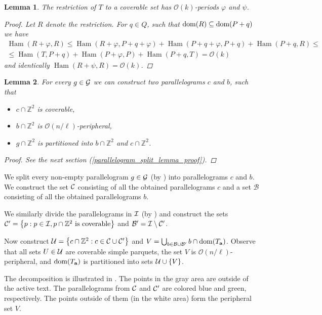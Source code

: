 \documentclass[11pt]{article}
\newcommand{\Z}{\mathbb{Z}}
\renewcommand{\O}{\mathcal{O}}
\renewcommand{\phi}{\varphi}
\newcommand{\set}[1]{\left\lbrace #1 \right\rbrace}
\newcommand{\eq}[1]{\begin{align*} #1 \end{align*}}
\theoremstyle{plain}
\newtheorem{lemma}{Lemma}
\theoremstyle{definition}
\theoremstyle{remark}
\DeclareMathOperator*{\Ham}{Ham}
\begin{document}
\begin{lemma}\label{coverable is periodic}
	The restriction of $T$ to a coverable set has $\O(k)$-periods $\phi$ and $\psi$.
	\begin{proof}
		Let $R$ denote the restriction. For $q \in Q$, such that $\operatorname*{dom}(R) \subseteq \operatorname*{dom}(P + q)$ we have
		\eq{
			\Ham(R + \phi, R) \le \Ham(R + \phi, P + q + \phi) + \Ham(P + q + \phi, P + q) + \Ham(P + q, R) \le \\
			\le \Ham(T, P + q) + \Ham(P + \phi, P) + \Ham(P + q, T) = \O(k)
		}
		and identically $\Ham(R + \psi, R) = \O(k)$.
	\end{proof}
\end{lemma}

\begin{lemma}\label{parallelogram_split_lemma}
	For every $g \in \mathcal{G}$ we can construct two parallelograms $c$ and $b$, such that
	\begin{itemize}
		\item $c \cap \Z^2$ is coverable,
		\item $b \cap \Z^2$ is $\O(n / \ell)$-peripheral,
		\item $g \cap \Z^2$ is partitioned into $b \cap \Z^2$ and $c \cap \Z^2$.
	\end{itemize}
	\begin{proof} See the next section (\ref{parallelogram_split_lemma_proof}). \end{proof}
\end{lemma}

\newcommand{\B}{\mathcal{B}}

We split every non-empty parallelogram $g \in \mathcal{G}$ (by ) into parallelograms $c$ and $b$.
We construct the set $\mathcal{C}$ consisting of all the obtained parallelograms $c$ and a set $\B$ consisting of all the obtained parallelograms $b$.

We similarly divide the parallelograms in $\mathcal{I}$ (by ) and construct the sets $\C' = \set{p : p \in \I, p \cap \Z^2 \text{ is coverable}}$ and $\B' = \I \setminus \C'$.

Now construct $\U = \set{c \cap \Z^2 : c \in \C \cup \C'}$ and $V = \bigcup_{b \in \B \cup \B'} b \cap \d{\Ta}$.
Observe that all sets $U \in \mathcal{U}$ are coverable simple parquets, the set $V$ is $\O(n / \ell)$-peripheral, and $\operatorname*{dom}(T_\mathbf{a})$ is partitioned into sets $\U \cup \set{V}$.

The decomposition is illustrated in .
The points in the gray area are outside of the active text.
The parallelograms from $\mathcal{C}$ and $\mathcal{C}'$ are colored blue and green, respectively.
The points outside of them (in the white area) form the peripheral set $V$.
\end{document}
